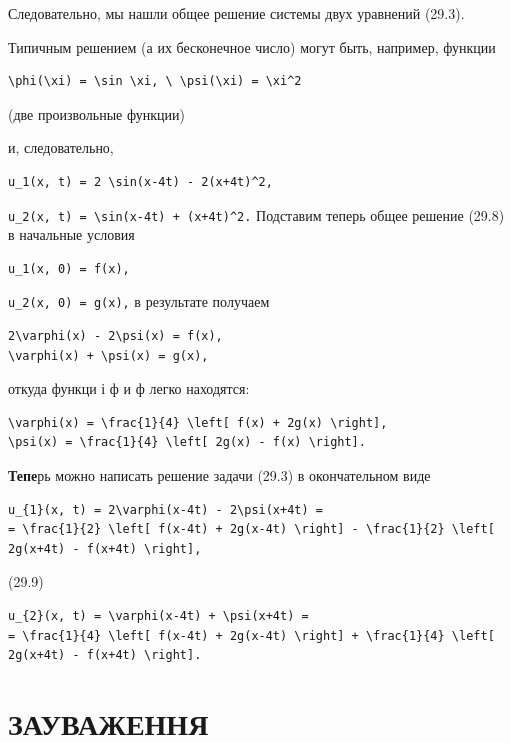 \documentclass[
  ukrainian,
]{article}
\begin{document}
Следовательно, мы нашли общее решение системы двух уравнений (29.3).

Типичным решением (а их бесконечное число) могут быть, например, функции

\begin{verbatim}
\phi(\xi) = \sin \xi, \ \psi(\xi) = \xi^2
\end{verbatim}

(две произвольные функции)

и, следовательно,

\begin{verbatim}
u_1(x, t) = 2 \sin(x-4t) - 2(x+4t)^2,
\end{verbatim}

\texttt{u\_2(x,\ t)\ =\ \textbackslash{}sin(x-4t)\ +\ (x+4t)\^{}2.}
Подставим теперь общее решение (29.8) в начальные условия

\begin{verbatim}
u_1(x, 0) = f(x),
\end{verbatim}

\texttt{u\_2(x,\ 0)\ =\ g(x),} в результате получаем

\begin{verbatim}
2\varphi(x) - 2\psi(x) = f(x),
\varphi(x) + \psi(x) = g(x),
\end{verbatim}

откуда функци і ф и ф легко находятся:

\begin{verbatim}
\varphi(x) = \frac{1}{4} \left[ f(x) + 2g(x) \right],
\psi(x) = \frac{1}{4} \left[ 2g(x) - f(x) \right].
\end{verbatim}

\textbf{Тепе}рь можно написать решение задачи (29.3) в окончательном
виде

\begin{verbatim}
u_{1}(x, t) = 2\varphi(x-4t) - 2\psi(x+4t) =
= \frac{1}{2} \left[ f(x-4t) + 2g(x-4t) \right] - \frac{1}{2} \left[ 2g(x+4t) - f(x+4t) \right],
\end{verbatim}

(29.9)

\begin{verbatim}
u_{2}(x, t) = \varphi(x-4t) + \psi(x+4t) =
= \frac{1}{4} \left[ f(x-4t) + 2g(x-4t) \right] + \frac{1}{4} \left[ 2g(x+4t) - f(x+4t) \right].
\end{verbatim}

\section{ЗАУВАЖЕННЯ}\label{ux437ux430ux443ux432ux430ux436ux435ux43dux43dux44f-2}
\end{document}

